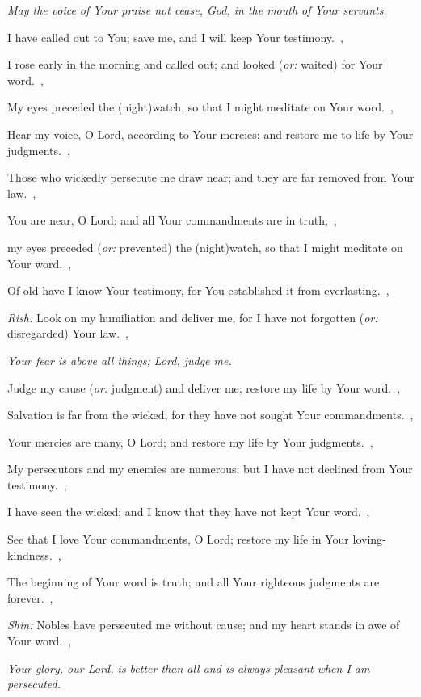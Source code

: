 \documentclass[12pt,twoside,a5paper]{article}
\newcommand{\qanona}[1]{{\liturgicalhint{Qanona.} \emph{#1}}}
\newcommand{\translationoption}[1]{\emph{or:} #1}
\begin{document}
\begin{normalparskip}
  \qanona{May the voice of Your praise not cease, God, in the mouth of Your servants.}

  I have called out to You; save me, and I will keep Your testimony.~\sep

  I rose early in the morning and called out; and looked (\translationoption{waited}) for Your word.~\sep

  My eyes preceded the (night)watch, so that I might meditate on Your word.~\sep

  Hear my voice, O Lord, according to Your mercies; and restore me to life by Your judgments.~\sep

  Those who wickedly persecute me draw near; and they are far removed from Your law.~\sep

  You are near, O Lord; and all Your commandments are in truth;~\sep

  my eyes preceded (\translationoption{prevented}) the (night)watch, so that I might meditate on Your word.~\sep

  Of old have I know Your testimony, for You established it from everlasting.~\sep

  \emph{Rish:} Look on my humiliation and deliver me, for I have not forgotten (\translationoption{disregarded}) Your law.~\sep

  \qanona{Your fear is above all things; Lord, judge me.}

  Judge my cause (\translationoption{judgment}) and deliver me; restore my life by Your word.~\sep

  Salvation is far from the wicked, for they have not sought Your commandments.~\sep

  Your mercies are many, O Lord; and restore my life by Your judgments.~\sep

  My persecutors and my enemies are numerous; but I have not declined from Your testimony.~\sep

  I have seen the wicked; and I know that they have not kept Your word.~\sep

  See that I love Your commandments, O Lord; restore my life in Your loving-kindness.~\sep

  The beginning of Your word is truth; and all Your righteous judgments are forever.~\sep

  \emph{Shin:} Nobles have persecuted me without cause; and my heart stands in awe of Your word.~\sep

  \qanona{Your glory, our Lord, is better than all and is always pleasant when I am persecuted.}


\end{normalparskip}
\end{document}
